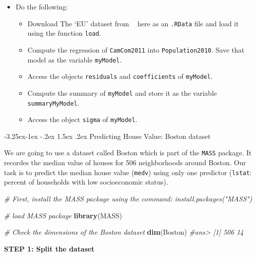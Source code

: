 \documentclass[]{book}
\makeatletter
\newenvironment{Shaded}{\begin{snugshade}}{\end{snugshade}}
\newcommand{\KeywordTok}[1]{\textcolor[rgb]{0.13,0.29,0.53}{\textbf{#1}}}
\newcommand{\CommentTok}[1]{\textcolor[rgb]{0.56,0.35,0.01}{\textit{#1}}}
\newcommand{\NormalTok}[1]{#1}
\providecommand{\tightlist}{%
  \setlength{\itemsep}{0pt}\setlength{\parskip}{0pt}}
\newenvironment{rmdblock}[1]
  {\begin{shaded*}
  \begin{itemize}
  \renewcommand{\labelitemi}{
    \raisebox{-.7\height}[0pt][0pt]{
      {\setkeys{Gin}{width=2em,keepaspectratio}\texttt{[image: img/icons/\#1]}}
    }
  }
  \item
  }
  {
  \end{itemize}
  \end{shaded*}
  }
\newenvironment{rmdexercise}
  {\begin{rmdblock}{exercise}}
  {\end{rmdblock}}
\renewcommand\subsection{\@startsection{subsection}{2}{\z@}%
                                     {-3.25ex\@plus -1ex \@minus -.2ex}%
                                     {1.5ex \@plus .2ex}%
                                     {\normalfont\large\bfseries\color{Violet}}}
\theoremstyle{definition}
\theoremstyle{definition}
\theoremstyle{definition}
\theoremstyle{remark}
\makeatother
\begin{document}
\begin{rmdexercise}
Do the following:

\begin{itemize}
\tightlist
\item
  Download The `EU' dataset from
  \textcolor{white}{[}\faTable\textcolor{white}{]} here as an
  \texttt{.RData} file and load it using the function \texttt{load}.
\item
  Compute the regression of \texttt{CamCom2011} into
  \texttt{Population2010}. Save that model as the variable
  \texttt{myModel}.
\item
  Access the objects \texttt{residuals} and \texttt{coefficients} of
  \texttt{myModel}.
\item
  Compute the summary of \texttt{myModel} and store it as the variable
  \texttt{summaryMyModel}.
\item
  Access the object \texttt{sigma} of \texttt{myModel}.
\end{itemize}
\end{rmdexercise}

\subsection{Predicting House Value: Boston
dataset}\label{predicting-house-value-boston-dataset}

We are going to use a dataset called Boston which is part of the
\texttt{MASS} package. It recordes the median value of houses for 506
neighborhoods around Boston. Our task is to predict the median house
value (\texttt{medv}) using only one predictor (\texttt{lstat}: percent
of households with low socioeconomic status).

\begin{Shaded}
\begin{Highlighting}[]
\CommentTok{# First, install the MASS package using the command: install.packages("MASS")}

\CommentTok{# load MASS package}
\KeywordTok{library}\NormalTok{(MASS)}

\CommentTok{# Check the dimensions of the Boston dataset}
\KeywordTok{dim}\NormalTok{(Boston)}
\CommentTok{#ans> [1] 506  14}
\end{Highlighting}
\end{Shaded}

\textbf{STEP 1: Split the dataset}
\end{document}
